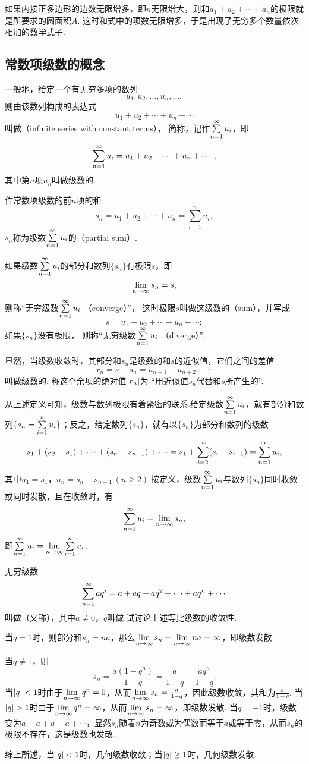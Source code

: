 如果内接正多边形的边数无限增多，即\(n\)无限增大，则和\(a_1+a_2+\dotsb+a_n\)的极限就是所要求的圆面积\(A\).
这时和式中的项数无限增多，于是出现了无穷多个数量依次相加的数学式子.

\subsection{常数项级数的概念}
\begin{definition}\label{definition:无穷级数.常数项级数的定义}
一般地，给定一个有无穷多项的数列\[
u_1,u_2,\dotsc,u_n,\dotsc,
\]则由该数列构成的表达式\[
u_1+u_2+\dotsb+u_n+\dotsb
\]叫做（infinite series with constant terms），
简称，记作\(\sum\limits_{n=1}^\infty u_i\)，即\[
\sum\limits_{n=1}^\infty u_i
= u_1+u_2+\dotsb+u_n+\dotsb,
\]
其中第\(n\)项\(u_n\)叫做级数的.

作常数项级数的前\(n\)项的和\[
s_n = u_1+u_2+\dotsb+u_n = \sum\limits_{i=1}^n{u_i},
\]\(s_n\)称为级数\(\sum\limits_{n=1}^\infty u_i\)的（partial sum）.

如果级数\(\sum\limits_{n=1}^\infty u_i\)的部分和数列\(\{s_n\}\)有极限\(s\)，即\[
\lim\limits_{n\to\infty} s_n = s,
\]则称“无穷级数\(\sum\limits_{n=1}^\infty u_i\) （converge）”，
这时极限\(s\)叫做这级数的（sum），并写成\[
s = u_1+u_2+\dotsb+u_n+\dotsb;
\]如果\(\{s_n\}\)没有极限，
则称“无穷级数\(\sum\limits_{n=1}^\infty u_i\) （diverge）”.

显然，当级数收敛时，其部分和\(s_n\)是级数的和\(s\)的近似值，它们之间的差值\[
r_n = s - s_n = u_{n+1}+u_{n+2}+\dotsb
\]叫做级数的.
称这个余项的绝对值\(\abs{r_n}\)为%
“用近似值\(s_n\)代替和\(s\)所产生的”.
\end{definition}
从上述定义可知，级数与数列极限有着紧密的联系.给定级数\(\sum\limits_{n=1}^\infty u_i\)，就有部分和数列\(\{s_n = \sum\limits_{i=1}^n u_i\}\)；反之，给定数列\(\{s_n\}\)，就有以\(\{s_n\}\)为部分和数列的级数\[
s_1 + (s_2-s_1) + \dotsb + (s_n-s_{n-1}) + \dotsb
= s_1 + \sum\limits_{i=2}^\infty (s_i-s_{i-1})
= \sum\limits_{n=1}^\infty u_i,
\]其中\(u_1=s_1\)，\(u_n=s_n-s_{n-1}\ (n \geq 2)\).按定义，级数\(\sum\limits_{n=1}^\infty u_i\)与数列\(\{s_n\}\)同时收敛或同时发散，且在收敛时，有\[
\sum\limits_{n=1}^\infty u_i = \lim\limits_{n\to\infty} s_n,
\]即\(\sum\limits_{n=1}^\infty u_i = \lim\limits_{n\to\infty} \sum\limits_{i=1}^n u_i\).

\begin{example}\label{example:无穷级数.等比级数的收敛性}
无穷级数\[
\sum\limits_{n=1}^\infty a q^i = a+aq+aq^2+\dotsb+aq^n+\dotsb
\]叫做（又称），其中\(a \neq 0\)，\(q\)叫做.试讨论上述等比级数的收敛性.
\begin{solution}
当\(q = 1\)时，则部分和\(s_n=na\)，那么\(\lim\limits_{n\to\infty} s_n = \lim\limits_{n\to\infty} na = \infty\)，即级数发散.

当\(q \neq 1\)，则\[
s_n = \frac{a(1-q^n)}{1-q} = \frac{a}{1-q} - \frac{aq^n}{1-q}.
\]
当\(\abs{q} < 1\)时由于\(\lim\limits_{n\to\infty} q^n=0\)，从而\(\lim\limits_{n\to\infty} s_n=\frac{a}{1-q}\)，因此级数收敛，其和为\(\frac{a}{1-q}\).
当\(\abs{q} > 1\)时由于\(\lim\limits_{n\to\infty} q^n=\infty\)，从而\(\lim\limits_{n\to\infty} s_n=\infty\)，即级数发散.
当\(q = -1\)时，级数变为\(a-a+a-a+\dotsb\)，显然\(s_n\)随着\(n\)为奇数或为偶数而等于\(a\)或等于零，从而\(s_n\)的极限不存在，这是级数也发散.

综上所述，{\color{red}当\(\abs{q} < 1\)时，几何级数收敛；当\(\abs{q} \geq 1\)时，几何级数发散.}
\end{solution}
\end{example}


